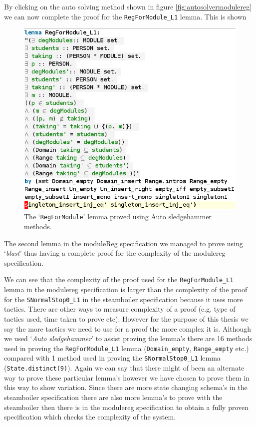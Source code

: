 By clicking on the auto solving method shown in figure
\ref{fig:autosolvermodulereg} we can now complete the proof for the
\verb|RegForModule_L1| lemma. This is shown 

\begin{figure}[H]
\centering
\includegraphics[scale=0.5]{Figures/Evaluation/provenmodulelemma.png}
\caption{The `\texttt{RegForModule}' lemma proved using Auto sledgehammer methods. \label{fig:solvedmodulelemma}}
\end{figure}

The second lemma in the moduleReg specification we managed to prove using
`\emph{blast}' thus having a complete proof for the complexity of the modulereg
specification.

We can see that the complexity of the proof used for the \verb|RegForModule_L1|
lemma in the modulereg specification is larger than the complexity of the proof
for the \verb|SNormalStop0_L1| in the steamboiler specification because it uses
more tactics.
There are other ways to measure
complexity of a proof (e.g. type of tactics used, time taken to prove etc). 
However for the purpose of this
thesis we say the more tactics we need to use for a proof the more complex it
is.  Although we
used `\emph{Auto sledgehammer}' to assist proving the lemma's there are 16
methods used in proving the \verb|RegForModule_L1| lemma (\verb|Domain_empty|,
\verb|Range_empty| etc.) compared with 1 method used in proving the
\verb|SNormalStop0_L1| lemma (\verb|State.distinct(9)|). Again we can say that
there might of been an alternate way to prove these particular lemma's however
we have chosen to prove them in this way to show variation. Since there are more
state changing schema's in the steamboiler specification there are also more
lemma's to prove with the steamboiler then there is in the modulereg
specification to obtain a fully proven specification which checks the complexity
of the system.

